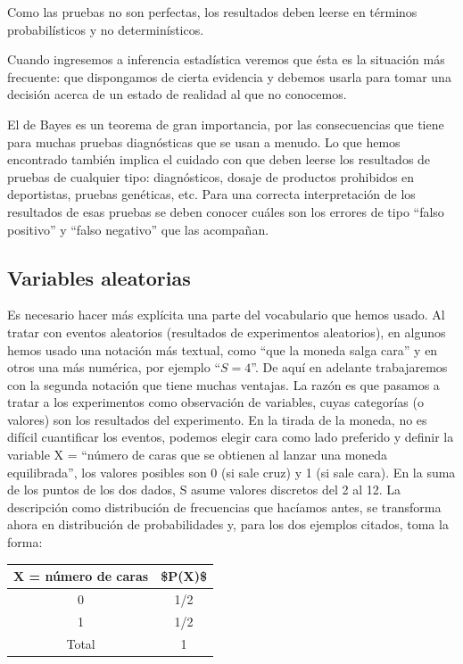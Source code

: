 \documentclass[]{article}
\begin{document}
Como las pruebas no son perfectas, los resultados deben leerse en
términos probabilísticos y no determinísticos.

Cuando ingresemos a inferencia estadística veremos que ésta es la
situación más frecuente: que dispongamos de cierta evidencia y debemos
usarla para tomar una decisión acerca de un estado de realidad al que no
conocemos.

El de Bayes es un teorema de gran importancia, por las consecuencias que
tiene para muchas pruebas diagnósticas que se usan a menudo. Lo que
hemos encontrado también implica el cuidado con que deben leerse los
resultados de pruebas de cualquier tipo: diagnósticos, dosaje de
productos prohibidos en deportistas, pruebas genéticas, etc. Para una
correcta interpretación de los resultados de esas pruebas se deben
conocer cuáles son los errores de tipo ``falso positivo'' y ``falso
negativo'' que las acompañan.

\hypertarget{variables-aleatorias}{%
\subsection{Variables aleatorias}\label{variables-aleatorias}}

Es necesario hacer más explícita una parte del vocabulario que hemos
usado. Al tratar con eventos aleatorios (resultados de experimentos
aleatorios), en algunos hemos usado una notación más textual, como ``que
la moneda salga cara'' y en otros una más numérica, por ejemplo
``\(S=4\)''. De aquí en adelante trabajaremos con la segunda notación
que tiene muchas ventajas. La razón es que pasamos a tratar a los
experimentos como observación de variables, cuyas categorías (o valores)
son los resultados del experimento. En la tirada de la moneda, no es
difícil cuantificar los eventos, podemos elegir cara como lado preferido
y definir la variable X = ``número de caras que se obtienen al lanzar
una moneda equilibrada'', los valores posibles son 0 (si sale cruz) y 1
(si sale cara). En la suma de los puntos de los dos dados, S asume
valores discretos del 2 al 12. La descripción como distribución de
frecuencias que hacíamos antes, se transforma ahora en distribución de
probabilidades y, para los dos ejemplos citados, toma la forma:

\begin{table}[H]
\centering
\begin{tabular}{cc}
\toprule
X = número de caras & \$P(X)\$\\
\midrule
\rowcolor{gray!6}  0 & 1/2\\
1 & 1/2\\
\rowcolor{gray!6}  Total & 1\\
\bottomrule
\end{tabular}
\end{table}
\end{document}
